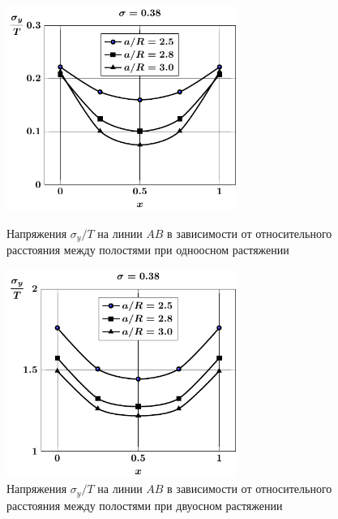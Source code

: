 \begin{russian}
\begin{figure}[h!]
\centering\footnotesize
\parbox[b]{7.5cm}{\centering\includegraphics[width=7.5cm]{spheres-cav13-a-t1-sig_y.pdf}
\caption{Напряжения $\sigma_y/T$ на линии $AB$ в зависимости от относительного расстояния между полостями при одноосном растяжении
\label{f:8:40}}}\hfil\hfil
\parbox[b]{7.5cm}{\centering\includegraphics[width=7.5cm]{spheres-cav13-a-t2-sig_y.pdf}
\caption{Напряжения $\sigma_y/T$ на линии $AB$ в зависимости от относительного расстояния между полостями при двуосном растяжении
\label{f:8:41}}}
\end{figure}


\end{russian}
